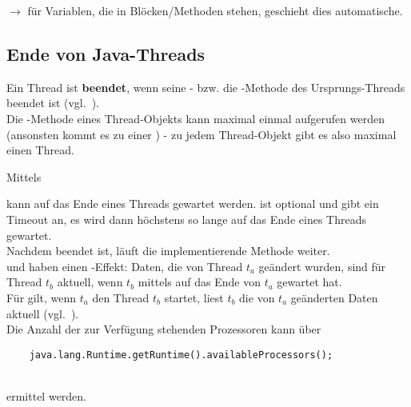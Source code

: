 $\rightarrow$ für Variablen, die in  Blöcken/Methoden stehen, geschieht dies automatische.

\subsection{Ende von Java-Threads}

Ein Thread ist \textbf{beendet}, wenn seine - bzw. die -Methode des Ursprungs-Threads beendet ist (vgl.~\cite[33]{Oec22}).\\

Die -Methode eines Thread-Objekts kann maximal einmal aufgerufen werden (ansonsten kommt es zu einer ) - zu jedem Thread-Objekt gibt es also maximal einen Thread.

Mittels

\begin{center}
     
\end{center}
kann auf das Ende eines Threads gewartet werden.
 ist optional und gibt ein Timeout an, es wird dann höchstens so lange auf das Ende eines Threads gewartet.\\
Nachdem  beendet ist, läuft die implementierende Methode weiter.\\

 und  haben einen -Effekt: Daten, die von Thread $t_a$ geändert wurden, sind für Thread $t_b$ aktuell, wenn $t_b$ mittels  auf das Ende von $t_a$ gewartet hat.\\
Für  gilt, wenn $t_a$ den Thread $t_b$ startet, liest $t_b$ die von $t_a$ geänderten Daten aktuell (vgl.~\cite[37]{Oec22}).\\

Die Anzahl der zur Verfügung stehenden Prozessoren kann über

\begin{verbatim}
    java.lang.Runtime.getRuntime().availableProcessors();
\end{verbatim}\\

ermittel werden.\\

